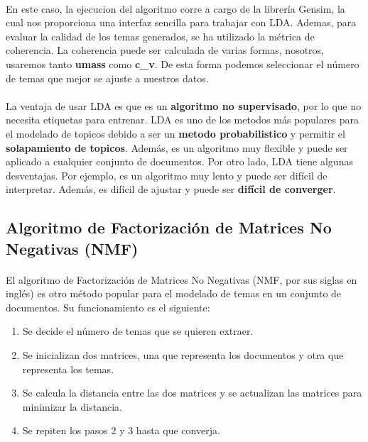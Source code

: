 \documentclass{report}
\begin{document}
{                \paragraph*{}{
                    En este caso, la ejecucion del algoritmo corre a cargo de la librería Gensim, la cual nos proporciona una interfaz sencilla para trabajar con LDA.
                    Ademas, para evaluar la calidad de los temas generados, se ha utilizado la métrica de coherencia. 
                    La coherencia puede ser calculada de varias formas, nosotros, usaremos tanto \textbf{umass} como \textbf{c\_v}.
                    De esta forma podemos seleccionar el número de temas que mejor se ajuste a nuestros datos.
                }
                \paragraph*{}{
                    La ventaja de usar LDA es que es un \textbf{algoritmo no supervisado}, por lo que no necesita etiquetas para entrenar.
                    LDA es uno de los metodos más populares para el modelado de topicos debido a ser un \textbf{metodo probabilistico} y permitir el \textbf{solapamiento de topicos}. 
                    Además, es un algoritmo muy flexible y puede ser aplicado a cualquier conjunto de documentos.
                    Por otro lado, LDA tiene algunas desventajas. 
                    Por ejemplo, es un algoritmo muy lento y puede ser difícil de interpretar. 
                    Además, es difícil de ajustar y puede ser \textbf{difícil de converger}.
                }
            \subsection{Algoritmo de Factorización de Matrices No Negativas (NMF)}
                \paragraph*{}{
                    El algoritmo de Factorización de Matrices No Negativas (NMF, por sus siglas en inglés) es otro método popular para el modelado de temas en un conjunto de documentos.
                    Su funcionamiento es el siguiente:
                }
                \begin{enumerate}
                    \item Se decide el número de temas que se quieren extraer.
                    \item Se inicializan dos matrices, una que representa los documentos y otra que representa los temas.
                    \item Se calcula la distancia entre las dos matrices y se actualizan las matrices para minimizar la distancia.
                    \item Se repiten los pasos 2 y 3 hasta que converja.
                \end{enumerate}
}
\end{document}
